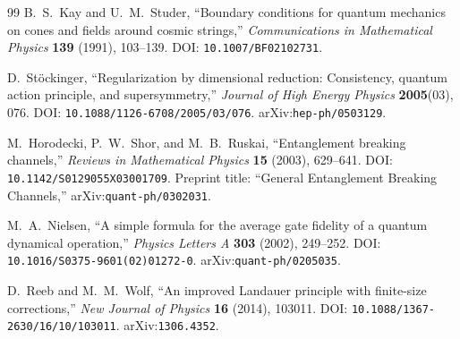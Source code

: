 \documentclass[11pt,a4paper]{article}
\theoremstyle{plain}
\theoremstyle{definition}
\theoremstyle{remark}
\numberwithin{equation}{section}
\begin{document}
\begin{thebibliography}{99}
\dag B.~S.~Kay and U.~M.~Studer,
``Boundary conditions for quantum mechanics on cones and fields
around cosmic strings,''
\emph{Communications in Mathematical Physics}
\textbf{139} (1991), 103--139.
DOI: \nolinkurl{10.1007/BF02102731}.

\dag D.~St\"ockinger,
``Regularization by dimensional reduction:
Consistency, quantum action principle, and supersymmetry,''
\emph{Journal of High Energy Physics} \textbf{2005}(03), 076.
DOI: \nolinkurl{10.1088/1126-6708/2005/03/076}.
arXiv:\nolinkurl{hep-ph/0503129}.

\dag M.~Horodecki, P.~W.~Shor, and M.~B.~Ruskai,
``Entanglement breaking channels,''
\emph{Reviews in Mathematical Physics} \textbf{15} (2003),
629--641.
DOI: \nolinkurl{10.1142/S0129055X03001709}.
Preprint title: ``General Entanglement Breaking Channels,''
arXiv:\nolinkurl{quant-ph/0302031}.

\dag M.~A.~Nielsen,
``A simple formula for the average gate fidelity of a quantum
dynamical operation,''
\emph{Physics Letters A} \textbf{303} (2002), 249--252.
DOI: \nolinkurl{10.1016/S0375-9601(02)01272-0}.
arXiv:\nolinkurl{quant-ph/0205035}.

\dag D.~Reeb and M.~M.~Wolf,
``An improved Landauer principle with finite-size corrections,''
\emph{New Journal of Physics} \textbf{16} (2014), 103011.
DOI: \nolinkurl{10.1088/1367-2630/16/10/103011}.
arXiv:\nolinkurl{1306.4352}.

\end{thebibliography}
\end{document}
